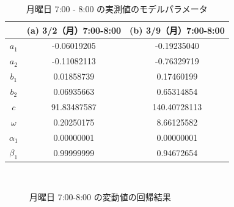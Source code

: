 \documentclass[technicalreport]{ieicej}
\begin{document}
\begin{table}[tb]
\centering
\caption{月曜日 7:00 - 8:00 の実測値のモデルパラメータ}
\label{norm-param}
\begin{tabular}{|c|c|c|}
\hline
&(a) 3/2（月）7:00-8:00&(b) 3/9（月）7:00-8:00\\
\hline
$a_1$&-0.06019205&-0.19235040\\
\hline
$a_2$&-0.11082113&-0.76329719\\
\hline
$b_1$&0.01858739&0.17460199\\
\hline
$b_2$&0.06935663&0.65314854\\
\hline
$c$&91.83487587&140.40728113\\
\hline
$\omega$&0.20250175&8.66125582\\
\hline
$\alpha_1$&0.00000001&0.00000001\\
\hline
$\beta_1$&0.99999999&0.94672654\\
\hline
\end{tabular}
\end{table}

\begin{figure}[tb]
\begin{center}
~
~
\caption{月曜日 7:00-8:00 の変動値の回帰結果}
\label{diff-reg}
\end{center}
\end{figure}
\end{document}
